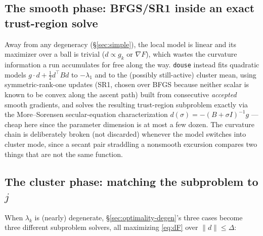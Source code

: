 \documentclass[11pt]{article}
\newcommand{\code}[1]{\texttt{#1}}
\theoremstyle{plain}
\begin{document}
\subsection{The smooth phase: BFGS/SR1 inside an exact trust-region solve}

Away from any degeneracy (\S\ref{sec:simple}), the local model is linear and its maximizer over a
ball is trivial ($d\propto g_k\text{ or }\nabla F$), which wastes the curvature information a run
accumulates for free along the way. \code{douse} instead fits quadratic models
$g\cdot d+\tfrac12 d^\top Bd$ to $-\lambda_1$ and to the (possibly still-active) cluster mean, using
symmetric-rank-one updates (SR1, chosen over BFGS because neither scalar is known to be convex
along the ascent path) built from consecutive \emph{accepted} smooth gradients, and solves the
resulting trust-region subproblem exactly via the More--Sorensen secular-equation characterization
$d(\sigma)=-(B+\sigma I)^{-1}g$ --- cheap here since the parameter dimension is at most a few dozen.
The curvature chain is deliberately broken (not discarded) whenever the model switches into cluster
mode, since a secant pair straddling a nonsmooth excursion compares two things that are not the
same function.

\subsection{The cluster phase: matching the subproblem to $j$}

When $\lambda_k$ is (nearly) degenerate, \S\ref{sec:optimality-degen}'s three cases become three
different subproblem solvers, all maximizing \eqref{eq:dF} over $\|d\|\le\Delta$:
\end{document}
